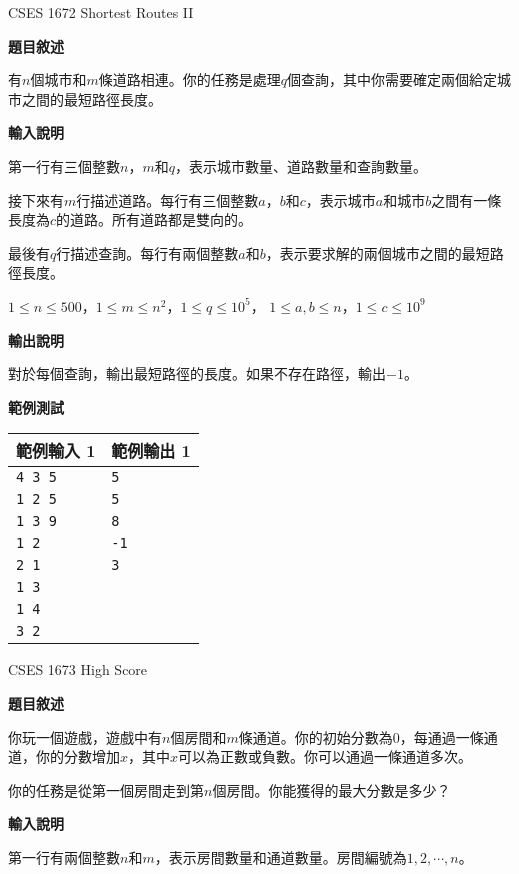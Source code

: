     \problem CSES 1672 Shortest Routes II

    \textbf{題目敘述}

    有$n$個城市和$m$條道路相連。你的任務是處理$q$個查詢，其中你需要確定兩個給定城市之間的最短路徑長度。

    \textbf{輸入說明}

    第一行有三個整數$n$，$m$和$q$，表示城市數量、道路數量和查詢數量。

    接下來有$m$行描述道路。每行有三個整數$a$，$b$和$c$，表示城市$a$和城市$b$之間有一條長度為$c$的道路。所有道路都是雙向的。

    最後有$q$行描述查詢。每行有兩個整數$a$和$b$，表示要求解的兩個城市之間的最短路徑長度。

    $1 \leq n \leq 500$，$1 \leq m \leq n^2$，$1 \leq q \leq 10^5$，
    $1 \leq a, b \leq n$，$1 \leq c \leq 10^9$

    \textbf{輸出說明}

    對於每個查詢，輸出最短路徑的長度。如果不存在路徑，輸出$-1$。

    \textbf{範例測試}

    \begin{tabular}{|m{7cm}|m{7cm}|}
        \hline
        範例輸入 1 & 範例輸出 1 \\
        \hline
        \verb|4 3 5|  & \verb|5| \\
        \verb|1 2 5|  & \verb|5| \\
        \verb|1 3 9|  & \verb|8| \\
        \verb|1 2|  & \verb|-1| \\
        \verb|2 1|  & \verb|3| \\
        \verb|1 3|  &\\
        \verb|1 4|  &\\
        \verb|3 2|  &\\
        \hline
    \end{tabular}

    \problem CSES 1673 High Score

    \textbf{題目敘述}

    你玩一個遊戲，遊戲中有$n$個房間和$m$條通道。你的初始分數為0，每通過一條通道，你的分數增加$x$，其中$x$可以為正數或負數。你可以通過一條通道多次。

    你的任務是從第一個房間走到第$n$個房間。你能獲得的最大分數是多少？

    \textbf{輸入說明}

    第一行有兩個整數$n$和$m$，表示房間數量和通道數量。房間編號為$1, 2, \cdots ,n$。

